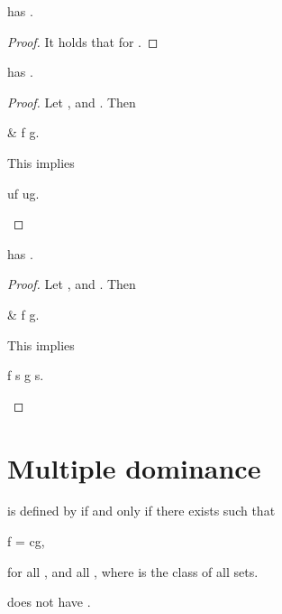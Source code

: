 \documentclass[b5paper, english, oneside]{memoir}
\begin{document}
\begin{theorem}
\label{ElementwiseOneSeparation}
 has .
\end{theorem}

\begin{proof}
It holds that   for . 
\end{proof}

\begin{theorem}
\label{ElementwiseSubHomogeneity}
 has .  
\end{theorem}

\begin{proof}
Let , and . Then
\begin{eqs}
{} & f \leq g.
\end{eqs}
This implies
\begin{eqs}
uf \leq ug.
\end{eqs}
  
\end{proof}

\begin{theorem}
\label{ElementwiseSubComposability}
 has .
\end{theorem}

\begin{proof}
Let , and . Then
\begin{eqs}
{} & f \leq g.
\end{eqs}
This implies
\begin{eqs}
f \circ s \leq g \circ s.
\end{eqs}
\end{proof}

\section{Multiple dominance}
\label{MultipleDominance}

\begin{definition}
  is defined by  if and only if there exists  such that
\begin{eqs}
f = cg,
\end{eqs}
for all , and all , where  is the class of all sets.
\end{definition}

\begin{theorem}
\label{MultipleOrderFails}
 does not have .
\end{theorem}
\end{document}
